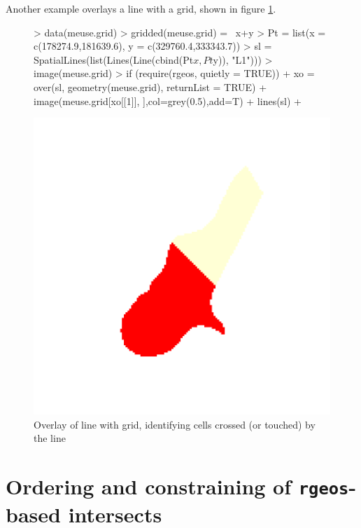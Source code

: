 \documentclass{article}
\newcommand{\code}[1]{{\tt #1}}
\begin{document}
Another example overlays a line with a grid, shown in figure \ref{fig:grid}.
\begin{figure}
\begin{Schunk}
\begin{Sinput}
> data(meuse.grid)
> gridded(meuse.grid) = ~x+y
> Pt = list(x = c(178274.9,181639.6), y = c(329760.4,333343.7))
> sl = SpatialLines(list(Lines(Line(cbind(Pt$x,Pt$y)), "L1")))
> image(meuse.grid)
> if (require(rgeos, quietly = TRUE)) {
+  xo = over(sl, geometry(meuse.grid), returnList = TRUE)
+  image(meuse.grid[xo[[1]], ],col=grey(0.5),add=T)
+  lines(sl)
+ }
\end{Sinput}
\end{Schunk}
\includegraphics{over-019}
\caption{ Overlay of line with grid, identifying cells crossed (or touched)
by the line }
\label{fig:grid}
\end{figure}

\section{Ordering and constraining of \code{rgeos}-based intersects}
\end{document}
